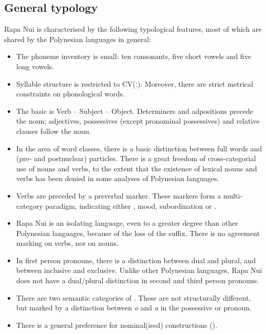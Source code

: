 \subsection{General typology}\label{sec:1.3.1}

Rapa Nui is characterised by the following typological features, most of which are shared by the Polynesian languages in general:

\begin{itemize}
\item 
The phoneme inventory is small: ten consonants, five short vowels and five long vowels.

\item 
Syllable structure is restricted to CV(ː). Moreover, there are strict metrical constraints on phonological words.

\item 
The basic  is Verb – Subject – Object. Determiners and adpositions precede the noun; adjectives, possessives (except pronominal possessives) and relative clauses follow the noun.

\item 
In the area of word classes, there is a basic distinction between full words and (pre- and postnuclear) particles. There is a great freedom of cross-categorial use of nouns and verbs, to the extent that the existence of lexical nouns and verbs has been denied in some analyses of Polynesian languages.

\item 
Verbs are preceded by a preverbal marker. These markers form a multi-category paradigm, indicating either , mood, subordination or .

\item 
Rapa Nui is an isolating language, even to a greater degree than other Polynesian languages, because of the loss of the  suffix. There is no agreement marking on verbs, nor  on nouns.

\item 
In first person pronouns, there is a distinction between dual and plural, and between inclusive and exclusive. Unlike other Polynesian languages, Rapa Nui does not have a dual/plural distinction in second and third person pronouns.

\item 
There are two semantic categories of . These are not structurally different, but marked by a distinction between \textit{o} and \textit{a} in the possessive  or pronoun.

\item 
There is a general preference for nominal(ised) constructions (). 

\end{itemize}

